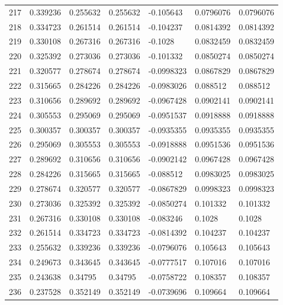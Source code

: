 \begin{longtable}{l|lll|lll}
 217 &  0.339236    & 0.255632    & 0.255632    & -0.105643    & 0.0796076   & 0.0796076   \\
 218 &  0.334723    & 0.261514    & 0.261514    & -0.104237    & 0.0814392   & 0.0814392   \\
 219 &  0.330108    & 0.267316    & 0.267316    & -0.1028      & 0.0832459   & 0.0832459   \\
 220 &  0.325392    & 0.273036    & 0.273036    & -0.101332    & 0.0850274   & 0.0850274   \\
 221 &  0.320577    & 0.278674    & 0.278674    & -0.0998323   & 0.0867829   & 0.0867829   \\
 222 &  0.315665    & 0.284226    & 0.284226    & -0.0983026   & 0.088512    & 0.088512    \\
 223 &  0.310656    & 0.289692    & 0.289692    & -0.0967428   & 0.0902141   & 0.0902141   \\
 224 &  0.305553    & 0.295069    & 0.295069    & -0.0951537   & 0.0918888   & 0.0918888   \\
 225 &  0.300357    & 0.300357    & 0.300357    & -0.0935355   & 0.0935355   & 0.0935355   \\
 226 &  0.295069    & 0.305553    & 0.305553    & -0.0918888   & 0.0951536   & 0.0951536   \\
 227 &  0.289692    & 0.310656    & 0.310656    & -0.0902142   & 0.0967428   & 0.0967428   \\
 228 &  0.284226    & 0.315665    & 0.315665    & -0.088512    & 0.0983025   & 0.0983025   \\
 229 &  0.278674    & 0.320577    & 0.320577    & -0.0867829   & 0.0998323   & 0.0998323   \\
 230 &  0.273036    & 0.325392    & 0.325392    & -0.0850274   & 0.101332    & 0.101332    \\
 231 &  0.267316    & 0.330108    & 0.330108    & -0.083246    & 0.1028      & 0.1028      \\
 232 &  0.261514    & 0.334723    & 0.334723    & -0.0814392   & 0.104237    & 0.104237    \\
 233 &  0.255632    & 0.339236    & 0.339236    & -0.0796076   & 0.105643    & 0.105643    \\
 234 &  0.249673    & 0.343645    & 0.343645    & -0.0777517   & 0.107016    & 0.107016    \\
 235 &  0.243638    & 0.34795     & 0.34795     & -0.0758722   & 0.108357    & 0.108357    \\
 236 &  0.237528    & 0.352149    & 0.352149    & -0.0739696   & 0.109664    & 0.109664    \\

\end{longtable}
